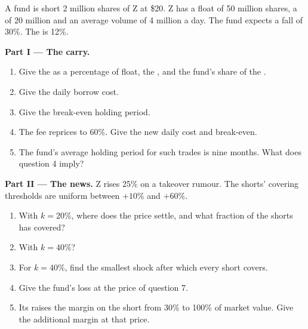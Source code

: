\begin{problem}\label{pb:m1:stock-loan-and-short-selling:1}
A fund is short 2 million shares of Z at \$20. Z has a float of 50 million
shares, a  of 20 million and an average volume of 4 million a
day. The fund expects a fall of 30\%. The  is 12\%.

\medskip\noindent\textbf{Part I --- The carry.}
\begin{enumerate}
\item Give the  as a percentage of float, the ,
and the fund's share of the .
\item Give the daily borrow cost.
\item Give the break-even holding period.
\item The fee reprices to 60\%. Give the new daily cost and break-even.
\item The fund's average holding period for such trades is nine months. What
does question 4 imply?
\end{enumerate}

\medskip\noindent\textbf{Part II --- The news.}
Z rises 25\% on a takeover rumour. The shorts' covering thresholds are
uniform between $+10\%$ and $+60\%$.
\begin{enumerate}[resume]
\item With $k = 20\%$, where does the price settle, and what fraction of the
shorts has covered?
\item With $k = 40\%$?
\item For $k = 40\%$, find the smallest shock after which every short covers.
\item Give the fund's  loss at the price of question 7.
\item Its  raises the margin on the short from 30\% to 100\% of
market value. Give the additional margin at that price.
\end{enumerate}


\end{problem}
